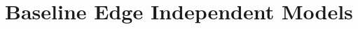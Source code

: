 \documentclass{article}
\newtheorem{theorem}{Theorem}
\newcommand{\R}{\mathbb{R}}
\newcommand{\norm}[1]{\|#1\|}
\newcommand{\E}{\mathbb{E}}
\begin{document}
% 
% 
%
%
%


\section{Baseline Edge Independent Models}
\label{sec:proposed}

\end{document}

